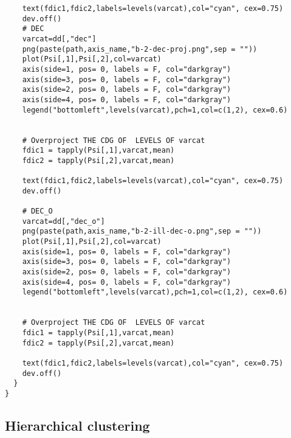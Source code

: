 \begin{verbatim}
    text(fdic1,fdic2,labels=levels(varcat),col="cyan", cex=0.75)
    dev.off()
    # DEC
    varcat=dd[,"dec"]
    png(paste(path,axis_name,"b-2-dec-proj.png",sep = ""))
    plot(Psi[,1],Psi[,2],col=varcat)
    axis(side=1, pos= 0, labels = F, col="darkgray")
    axis(side=3, pos= 0, labels = F, col="darkgray")
    axis(side=2, pos= 0, labels = F, col="darkgray")
    axis(side=4, pos= 0, labels = F, col="darkgray")
    legend("bottomleft",levels(varcat),pch=1,col=c(1,2), cex=0.6)
    
    
    # Overproject THE CDG OF  LEVELS OF varcat
    fdic1 = tapply(Psi[,1],varcat,mean)
    fdic2 = tapply(Psi[,2],varcat,mean)
    
    text(fdic1,fdic2,labels=levels(varcat),col="cyan", cex=0.75)
    dev.off()
    
    # DEC_O
    varcat=dd[,"dec_o"]
    png(paste(path,axis_name,"b-2-ill-dec-o.png",sep = ""))
    plot(Psi[,1],Psi[,2],col=varcat)
    axis(side=1, pos= 0, labels = F, col="darkgray")
    axis(side=3, pos= 0, labels = F, col="darkgray")
    axis(side=2, pos= 0, labels = F, col="darkgray")
    axis(side=4, pos= 0, labels = F, col="darkgray")
    legend("bottomleft",levels(varcat),pch=1,col=c(1,2), cex=0.6)
    
    
    # Overproject THE CDG OF  LEVELS OF varcat
    fdic1 = tapply(Psi[,1],varcat,mean)
    fdic2 = tapply(Psi[,2],varcat,mean)
    
    text(fdic1,fdic2,labels=levels(varcat),col="cyan", cex=0.75)
    dev.off()
  }
}

\end{verbatim}

\subsection{Hierarchical clustering}

